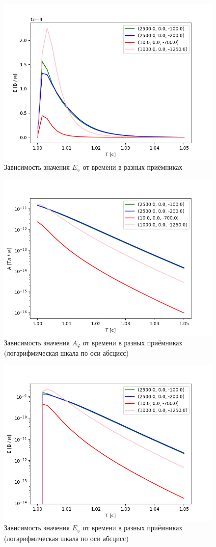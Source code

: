 \begin{figure}
	\centering
	\includegraphics[width=0.8\linewidth]{images/Normal_E.png}
	\caption{Зависимость значения $E_{\varphi}$ от времени в разных приёмниках}
	\label{fig:NatE}
\end{figure}


\begin{figure}
	\centering
	\includegraphics[width=0.8\linewidth]{images/Log_A.png}
	\caption{Зависимость значения $A_{\varphi}$ от времени в разных приёмниках (логарифмическая шкала по оси абсцисс)}
	\label{fig:LogA}
\end{figure}

\begin{figure}
	\centering
	\includegraphics[width=0.8\linewidth]{images/Log_E.png}
	\caption{Зависимость значения $E_{\varphi}$ от времени в разных приёмниках (логарифмическая шкала по оси абсцисс)}
	\label{fig:LogE}
\end{figure} 

